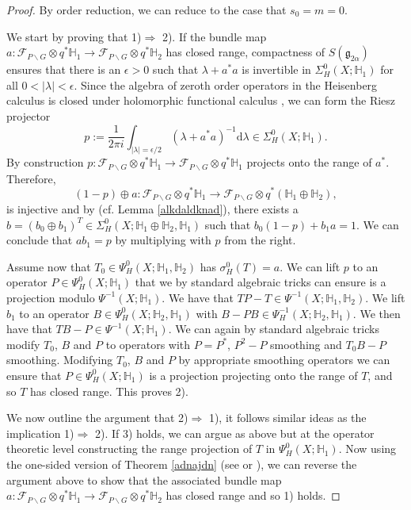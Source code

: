 \documentclass[a4paper,reqno]{amsart}
\numberwithin{equation}{section}
\theoremstyle{definition}
\theoremstyle{remark}
\begin{document}
\begin{proof}
By order reduction, we can reduce to the case that $s_0=m=0$. 

We start by proving that 1)$\Rightarrow$ 2). If the bundle map $a:\mathcal{F}_{P\backslash G}\otimes q^*\mathbb{H}_1\to \mathcal{F}_{P\backslash G}\otimes q^*\mathbb{H}_2$ has closed range, compactness of $S(\mathfrak{g}_{2\alpha})$ ensures that there is an $\epsilon>0$ such that $\lambda+a^*a$ is invertible in $\Sigma^0_H(X;\mathbb{H}_1)$ for all $0<|\lambda|<\epsilon$. Since the algebra of zeroth order operators in the Heisenberg calculus is closed under holomorphic functional calculus \cite{pongecrelle, vanerppol}, we can form the Riesz projector
$$p:=\frac{1}{2\pi i}\int_{|\lambda|=\epsilon/2} (\lambda+a^*a)^{-1}\mathrm{d}\lambda\in \Sigma^0_H(X;\mathbb{H}_1).$$ 
By construction $p:\mathcal{F}_{P\backslash G}\otimes q^*\mathbb{H}_1\to \mathcal{F}_{P\backslash G}\otimes q^*\mathbb{H}_1$ projects onto the range of $a^*$. Therefore, 
$$(1-p)\oplus a:\mathcal{F}_{P\backslash G}\otimes q^*\mathbb{H}_1\to \mathcal{F}_{P\backslash G}\otimes q^*(\mathbb{H}_1\oplus \mathbb{H}_2),$$
is injective and by \cite[Lemma 3.9]{Dave_Haller1} (cf. Lemma \ref{alkdaldknad}), there exists a $b=(b_0\oplus b_1)^T\in \Sigma^0_H(X;\mathbb{H}_1\oplus \mathbb{H}_2,\mathbb{H}_1)$ such that $b_0(1-p)+b_1a=1$. We can conclude that $ab_1=p$ by multiplying with $p$ from the right. 

Assume now that $T_0\in \Psi^0_H(X;\mathbb{H}_1,\mathbb{H}_2)$ has $\sigma^0_H(T)=a$. We can lift $p$ to an operator $P\in \Psi^0_H(X;\mathbb{H}_1)$ that we by standard algebraic tricks can ensure is a projection modulo $\Psi^{-1}(X;\mathbb{H}_1)$. We have that $TP-T\in \Psi^{-1}(X;\mathbb{H}_1,\mathbb{H}_2)$. We lift $b_1$ to an operator $B\in \Psi^0_H(X;\mathbb{H}_2,\mathbb{H}_1)$ with $B-PB\in \Psi^{-1}_H(X;\mathbb{H}_2,\mathbb{H}_1)$. We then have that $TB-P\in \Psi^{-1}(X;\mathbb{H}_1)$. We can again by standard algebraic tricks modify $T_0$, $B$ and $P$ to operators with $P=P^*$, $P^2-P$ smoothing and $T_0B-P$ smoothing. Modifying $T_0$, $B$ and $P$ by appropriate smoothing operators we can ensure that $P\in \Psi^0_H(X;\mathbb{H}_1)$ is a projection projecting onto the range of $T$, and so $T$ has closed range. This proves 2).

We now outline the argument that 2)$\Rightarrow$ 1), it follows similar ideas as the implication 1)$\Rightarrow$ 2). If 3) holds, we can argue as above but at the operator theoretic level constructing the range projection of $T$ in $\Psi^0_H(X;\mathbb{H}_1)$. Now using the one-sided version of Theorem \ref{adnajdn} (see \cite[Section 3.2]{Dave_Haller1} or \cite{andromoyu}), we can reverse the argument above to show that the associated bundle map $a:\mathcal{F}_{P\backslash G}\otimes q^*\mathbb{H}_1\to \mathcal{F}_{P\backslash G}\otimes q^*\mathbb{H}_2$ has closed range and so 1) holds.
\end{proof}
\end{document}
